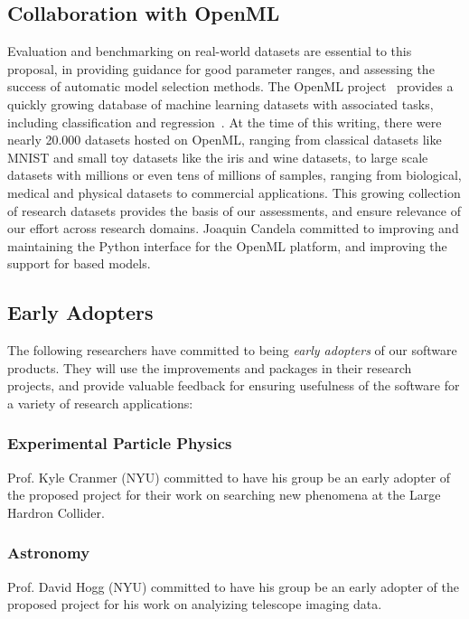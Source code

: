 \subsection{Collaboration with OpenML}
Evaluation and benchmarking on real-world datasets are essential to this
proposal, in providing guidance for good parameter ranges, and assessing the
success of automatic model selection methods. The OpenML
project~\autocite{van2013openml} provides a quickly growing database of machine
learning datasets with associated tasks, including classification and
regression~\autocite{vanschoren2014openml}. At the time of this writing, there
were nearly 20.000 datasets hosted on OpenML, ranging from classical datasets
like MNIST and small toy datasets like the iris and wine datasets, to large
scale datasets with millions or even tens of millions of samples, ranging from
biological, medical and physical datasets to commercial applications. This
growing collection of research datasets provides the basis of our assessments,
and ensure relevance of our effort across research domains.  Joaquin Candela
committed to improving and maintaining the Python interface for the OpenML
platform, and improving the support for \sklearn{} based models.

\subsection{Early Adopters}
The following researchers have committed to being \emph{early adopters} of our
software products. They will use the improvements and packages in their
research projects, and provide valuable feedback for ensuring usefulness of the
software for a variety of research applications:

\subsubsection{Experimental Particle Physics}
Prof. Kyle Cranmer (NYU) committed to have his group be an early adopter of the
proposed project for their work on searching new phenomena at the Large Hardron
Collider.

\subsubsection{Astronomy}
Prof. David Hogg (NYU) committed to have his group be an
early adopter of the proposed project for his work on analyizing
telescope imaging data.

